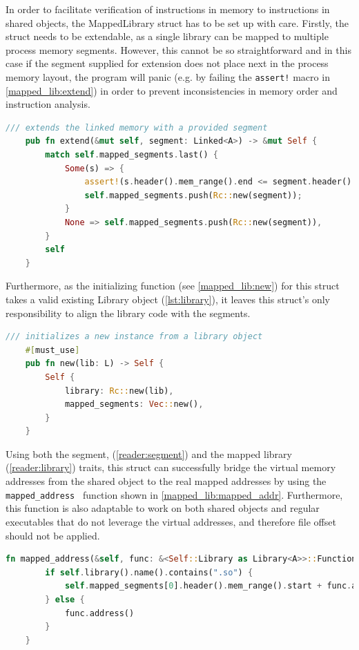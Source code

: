 In order to facilitate verification of instructions in memory to instructions in shared objects, the MappedLibrary struct has to be set up with care.
Firstly, the struct needs to be extendable, as a single library can be mapped to multiple process memory segments.
However, this cannot be so straightforward and in this case if the segment supplied for extension does not place next in the process memory layout, the program will panic (e.g. by failing the \verb|assert!| macro in \autoref{mapped_lib:extend}) in order to prevent inconsistencies in memory order and instruction analysis.
\begin{lstlisting}[caption=\label{mapped_lib:extend}{The extend function for the MappedLibrary struct}, language=Rust, breaklines=true]
/// extends the linked memory with a provided segment
    pub fn extend(&mut self, segment: Linked<A>) -> &mut Self {
        match self.mapped_segments.last() {
            Some(s) => {
                assert!(s.header().mem_range().end <= segment.header().mem_range().start);
                self.mapped_segments.push(Rc::new(segment));
            }
            None => self.mapped_segments.push(Rc::new(segment)),
        }
        self
    }
\end{lstlisting}
Furthermore, as the initializing function (see \autoref{mapped_lib:new}) for this struct takes a valid existing Library object (\autoref{lst:library}), it leaves this struct's only responsibility to align the library code with the segments.
\begin{lstlisting}[caption=\label{mapped_lib:new}{The creator function for the MappedLibrary struct}, language=Rust, breaklines=true]
 /// initializes a new instance from a library object
    #[must_use]
    pub fn new(lib: L) -> Self {
        Self {
            library: Rc::new(lib),
            mapped_segments: Vec::new(),
        }
    }
\end{lstlisting}

Using both the segment, (\autoref{reader:segment}) and the mapped library (\autoref{reader:library}) traits, this struct can successfully bridge the virtual memory addresses from the shared object to the real mapped addresses by using the \verb| mapped_address | function shown in \autoref{mapped_lib:mapped_addr}.
Furthermore, this function is also adaptable to work on both shared objects and regular executables that do not leverage the virtual addresses, and therefore file offset should not be applied.

\begin{lstlisting}[caption=\label{mapped_lib:mapped_addr}{The mapped\_address function for the MappedLibrary struct}, language=Rust, breaklines=true]
fn mapped_address(&self, func: &<Self::Library as Library<A>>::Function) -> u64 {
        if self.library().name().contains(".so") {
            self.mapped_segments[0].header().mem_range().start + func.address()
        } else {
            func.address()
        }
    }
\end{lstlisting}



